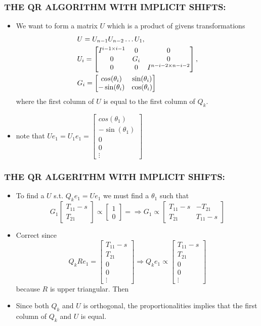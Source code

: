 \documentclass[a4paper,8pt]{beamer} %
\newcommand{\smatrix}[1]{\left[\begin{matrix} #1 \end{matrix}\right]}
\begin{document}
\begin{frame} %
\frametitle{THE QR ALGORITHM WITH IMPLICIT SHIFTS:} 
	\begin{itemize}
		\item
		We want to form a matrix $U$ which is a product of givens transformations
		\begin{align}
			&U = U_{n-1}U_{n-2}\dots U_{1}, \notag\\ 
			&U_i = 
			\smatrix{ 
				I^{i-1\times i-1} 	& 0 	& 0 \\ 
				0 					& G_i 	& 0 \\ 
				0 					& 0 	& I^{n-i-2\times n-i-2}}, \notag\\
				&G_i = \smatrix{cos(\theta_i) & \sin(\theta_i) \\ -\sin(\theta_i) & \cos(\theta_i)}
		\end{align}
		where the first column of $U$ is equal to the first column of $Q_k$.
		\item
		note that $Ue_1 = U_1e_1 = \smatrix{cos(\theta_1)\\ -\sin(\theta_1) \\ 0 \\ 0 \\ \vdots}$
	\end{itemize}
\end{frame}%

\begin{frame}  %
\frametitle{THE QR ALGERITHM WITH IMPLICIT SHIFTS:}
	\begin{itemize}
		\item
			To find a $U$ s.t. $Q_ke_1=Ue_1$ we must find a $\theta_1$ such that
			\begin{equation}
				G_1 
				\smatrix{ T_{11}-s \\ T_{21} } \propto \smatrix{ 1 \\ 0} = 
				\Rightarrow
				G_1 \propto  \smatrix{T_{11}-s & -T_{21} \\ T_{21} & T_{11}-s}
			\end{equation}
		\item
			Correct since
			\begin{equation}
				Q_kRe_1 = \smatrix{T_{11}-s\\T_{21}\\0\\0\\ \vdots} 
				\Rightarrow Q_ke_1 \propto  \smatrix{T_{11}-s\\T_{21} \\0\\0\\ \vdots}
			\end{equation}
			because $R$ is upper triangular. Then
		\item
			Since both $Q_k$ and $U$ is orthogonal, the proportionalities implies that 
			the first column of $Q_k$ and $U$ is equal.
	\end{itemize}
\end{frame}%
\end{document}
